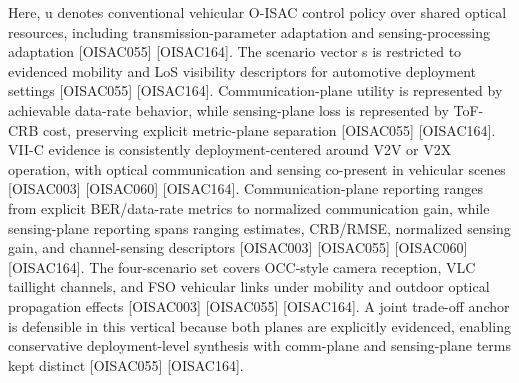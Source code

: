 {}Here, u denotes conventional vehicular O-ISAC control policy over shared optical resources, including transmission-parameter adaptation and sensing-processing adaptation [O\markdownRendererUnderscore{}ISAC\markdownRendererUnderscore{}055] [O\markdownRendererUnderscore{}ISAC\markdownRendererUnderscore{}164]. The scenario vector s is restricted to evidenced mobility and LoS visibility descriptors for automotive deployment settings [O\markdownRendererUnderscore{}ISAC\markdownRendererUnderscore{}055] [O\markdownRendererUnderscore{}ISAC\markdownRendererUnderscore{}164]. Communication-plane utility is represented by achievable data-rate behavior, while sensing-plane loss is represented by ToF-CRB cost, preserving explicit metric-plane separation [O\markdownRendererUnderscore{}ISAC\markdownRendererUnderscore{}055] [O\markdownRendererUnderscore{}ISAC\markdownRendererUnderscore{}164].\markdownRendererParagraphSeparator
{}\markdownRendererInterblockSeparator
{}\markdownRendererUlBeginTight
\markdownRendererUlItem VII-C evidence is consistently deployment-centered around V2V or V2X operation, with optical communication and sensing co-present in vehicular scenes [O\markdownRendererUnderscore{}ISAC\markdownRendererUnderscore{}003] [O\markdownRendererUnderscore{}ISAC\markdownRendererUnderscore{}060] [O\markdownRendererUnderscore{}ISAC\markdownRendererUnderscore{}164].\markdownRendererUlItemEnd 
\markdownRendererUlItem Communication-plane reporting ranges from explicit BER/data-rate metrics to normalized communication gain, while sensing-plane reporting spans ranging estimates, CRB/RMSE, normalized sensing gain, and channel-sensing descriptors [O\markdownRendererUnderscore{}ISAC\markdownRendererUnderscore{}003] [O\markdownRendererUnderscore{}ISAC\markdownRendererUnderscore{}055] [O\markdownRendererUnderscore{}ISAC\markdownRendererUnderscore{}060] [O\markdownRendererUnderscore{}ISAC\markdownRendererUnderscore{}164].\markdownRendererUlItemEnd 
\markdownRendererUlItem The four-scenario set covers OCC-style camera reception, VLC taillight channels, and FSO vehicular links under mobility and outdoor optical propagation effects [O\markdownRendererUnderscore{}ISAC\markdownRendererUnderscore{}003] [O\markdownRendererUnderscore{}ISAC\markdownRendererUnderscore{}055] [O\markdownRendererUnderscore{}ISAC\markdownRendererUnderscore{}164].\markdownRendererUlItemEnd 
\markdownRendererUlItem A joint trade-off anchor is defensible in this vertical because both planes are explicitly evidenced, enabling conservative deployment-level synthesis with comm-plane and sensing-plane terms kept distinct [O\markdownRendererUnderscore{}ISAC\markdownRendererUnderscore{}055] [O\markdownRendererUnderscore{}ISAC\markdownRendererUnderscore{}164].\markdownRendererUlItemEnd 
